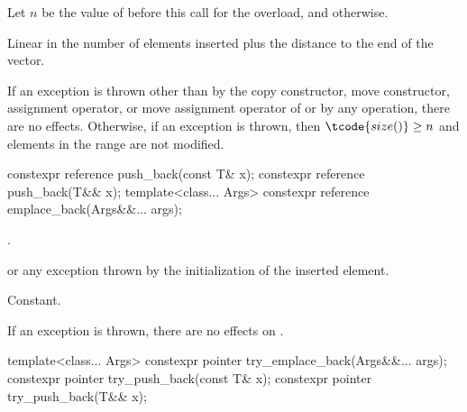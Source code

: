 \begin{itemdescr}
\pnum
Let $n$ be the value of  before this call for
the  overload, and
 otherwise.

\pnum
\complexity
Linear in the number of elements inserted plus
the distance to the end of the vector.

\pnum
\remarks
If an exception is thrown other than by the
copy constructor,
move constructor,
assignment operator, or
move assignment operator
of  or by
any  operation,
there are no effects.
Otherwise,
if an exception is thrown, then
$\tcode{size()} \ge n$ and
elements in the range  are not modified.
\end{itemdescr}

%
%
\begin{itemdecl}
constexpr reference push_back(const T& x);
constexpr reference push_back(T&& x);
template<class... Args>
  constexpr reference emplace_back(Args&&... args);
\end{itemdecl}

\begin{itemdescr}
\pnum
\returns
{}.

\pnum
\throws
{} or
any exception thrown by the initialization of the inserted element.

\pnum
\complexity
Constant.

\pnum
\remarks
If an exception is thrown, there are no effects on .
\end{itemdescr}

%
%
\begin{itemdecl}
template<class... Args>
  constexpr pointer try_emplace_back(Args&&... args);
constexpr pointer try_push_back(const T& x);
constexpr pointer try_push_back(T&& x);
\end{itemdecl}

